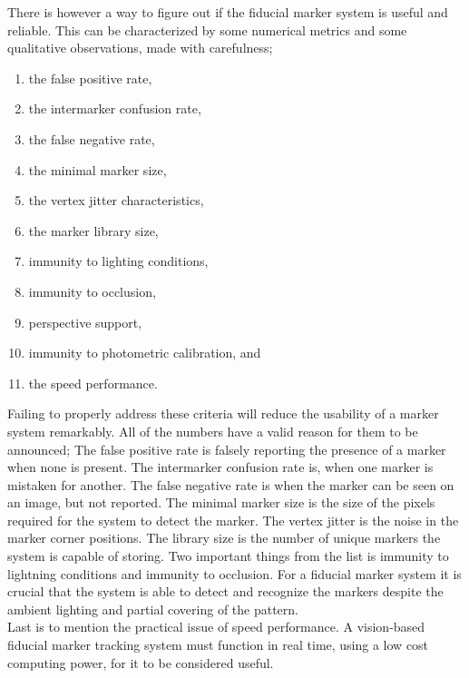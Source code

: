 			There is however a way to figure out if the fiducial marker system is useful and reliable. This can be characterized by some numerical metrics and some qualitative observations, made with carefulness;\\
			\begin{enumerate}
				\item the false positive rate,
				\item the intermarker confusion rate,
				\item the false negative rate,
				\item the minimal marker size,
				\item the vertex jitter characteristics,
				\item the marker library size,
				\item immunity to lighting conditions,
				\item immunity to occlusion,
				\item perspective support,
				\item immunity to photometric calibration, and
				\item the speed performance.\\
			\end{enumerate}
			
			Failing to properly address these criteria will reduce the usability of a marker system remarkably\cite{fiducialMarkers}. All of the numbers have a valid reason for them to be announced; The false positive rate is falsely reporting the presence of a marker when none is present. The intermarker confusion rate is, when one marker is mistaken for another. The false negative rate is when the marker can be seen on an image, but not reported. The minimal marker size is the size of the pixels required for the system to detect the marker. The vertex jitter is the noise in the marker corner positions. The library size is the number of unique markers the system is capable of storing. Two important things from the list is immunity to lightning conditions and immunity to occlusion. For a fiducial marker system it is crucial that the system is able to detect and recognize the markers despite the ambient lighting and partial covering of the pattern.\\
			Last is to mention the practical issue of speed performance. A vision-based fiducial marker tracking system must function in real time, using a low cost computing power, for it to be considered useful.\\
			
